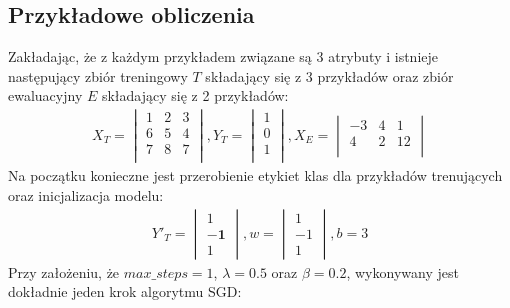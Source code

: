 \documentclass[
    left=2.5cm,         %
    right=2.5cm,        %
    top=2.5cm,          %
    bottom=3cm,         %
    bindingoffset=6mm,  %
    nohyphenation=false %
]{eiti/eiti-report}
\begin{document}
\subsection{Przykładowe obliczenia}
Zakładając, że z każdym przykładem związane są 3 atrybuty i istnieje następujący zbiór treningowy $T$  składający się z 3 przykładów oraz zbiór ewaluacyjny $E$ składający się z 2 przykładów:
\begin{gather*}
    X_T= \begin{vmatrix}
        1&2&3\\
        6&5&4\\
        7&8&7\\
    \end{vmatrix},
    Y_T= \begin{vmatrix}
        1\\
        0\\
        1\\
    \end{vmatrix}, 
    X_E= \begin{vmatrix}
        -3&4&1\\
        4&2&12\\
    \end{vmatrix}
\end{gather*}
Na początku konieczne jest przerobienie etykiet klas dla przykładów trenujących oraz inicjalizacja modelu:
\begin{gather*}
    Y'_T= \begin{vmatrix}
        1\\
        \pmb{-1}\\
        1
    \end{vmatrix}, 
    w = \begin{vmatrix}
        1\\
        -1\\
        1
    \end{vmatrix},  b = 3
\end{gather*}
Przy założeniu, że $max\_steps=1$, $\lambda = 0.5$ oraz $\beta = 0.2$, wykonywany jest dokładnie jeden krok algorytmu SGD:
\end{document}
